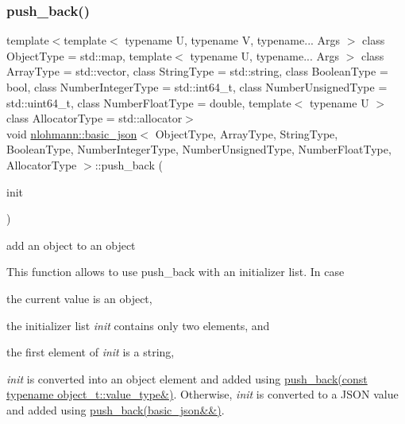 \subsubsection{\texorpdfstring{push\+\_\+back()}{push\_back()}\hspace{0.1cm}{\footnotesize\ttfamily [4/4]}}
{\footnotesize\ttfamily template$<$template$<$ typename U, typename V, typename... Args $>$ class Object\+Type = std\+::map, template$<$ typename U, typename... Args $>$ class Array\+Type = std\+::vector, class String\+Type  = std\+::string, class Boolean\+Type  = bool, class Number\+Integer\+Type  = std\+::int64\+\_\+t, class Number\+Unsigned\+Type  = std\+::uint64\+\_\+t, class Number\+Float\+Type  = double, template$<$ typename U $>$ class Allocator\+Type = std\+::allocator$>$ \\
void \hyperlink{classnlohmann_1_1basic__json}{nlohmann\+::basic\+\_\+json}$<$ Object\+Type, Array\+Type, String\+Type, Boolean\+Type, Number\+Integer\+Type, Number\+Unsigned\+Type, Number\+Float\+Type, Allocator\+Type $>$\+::push\+\_\+back (\begin{DoxyParamCaption}\item[{std\+::initializer\+\_\+list$<$ \hyperlink{classnlohmann_1_1basic__json}{basic\+\_\+json}$<$ Object\+Type, Array\+Type, String\+Type, Boolean\+Type, Number\+Integer\+Type, Number\+Unsigned\+Type, Number\+Float\+Type, Allocator\+Type $>$ $>$}]{init }\end{DoxyParamCaption})\hspace{0.3cm}{\ttfamily [inline]}}



add an object to an object 

This function allows to use {\ttfamily push\+\_\+back} with an initializer list. In case


\begin{DoxyEnumerate}
\item the current value is an object,
\item the initializer list {\itshape init} contains only two elements, and
\item the first element of {\itshape init} is a string,
\end{DoxyEnumerate}

{\itshape init} is converted into an object element and added using \hyperlink{classnlohmann_1_1basic__json_a5212588544f6d2266384c3be9bfda0c5}{push\+\_\+back(const typename object\+\_\+t\+::value\+\_\+type\&)}. Otherwise, {\itshape init} is converted to a J\+S\+ON value and added using \hyperlink{classnlohmann_1_1basic__json_a486b96adbf4886c38e38c952394a220f}{push\+\_\+back(basic\+\_\+json\&\&)}.


